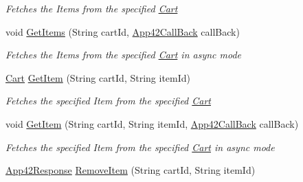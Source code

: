 \begin{DoxyCompactItemize}
\begin{DoxyCompactList}\small\item\em Fetches the Items from the specified \hyperlink{classcom_1_1shephertz_1_1app42_1_1paas_1_1sdk_1_1csharp_1_1shopping_1_1_cart}{Cart} \end{DoxyCompactList}\item 
void \hyperlink{classcom_1_1shephertz_1_1app42_1_1paas_1_1sdk_1_1csharp_1_1shopping_1_1_cart_service_a9acdad2e9b0f1a8f81d6e87d1d04dfe1}{Get\+Items} (String cart\+Id, \hyperlink{interfacecom_1_1shephertz_1_1app42_1_1paas_1_1sdk_1_1csharp_1_1_app42_call_back}{App42\+Call\+Back} call\+Back)
\begin{DoxyCompactList}\small\item\em Fetches the Items from the specified \hyperlink{classcom_1_1shephertz_1_1app42_1_1paas_1_1sdk_1_1csharp_1_1shopping_1_1_cart}{Cart} in async mode \end{DoxyCompactList}\item 
\hyperlink{classcom_1_1shephertz_1_1app42_1_1paas_1_1sdk_1_1csharp_1_1shopping_1_1_cart}{Cart} \hyperlink{classcom_1_1shephertz_1_1app42_1_1paas_1_1sdk_1_1csharp_1_1shopping_1_1_cart_service_a76c71f83b16bacb5ea60d1f59ee132e8}{Get\+Item} (String cart\+Id, String item\+Id)
\begin{DoxyCompactList}\small\item\em Fetches the specified Item from the specified \hyperlink{classcom_1_1shephertz_1_1app42_1_1paas_1_1sdk_1_1csharp_1_1shopping_1_1_cart}{Cart} \end{DoxyCompactList}\item 
void \hyperlink{classcom_1_1shephertz_1_1app42_1_1paas_1_1sdk_1_1csharp_1_1shopping_1_1_cart_service_ae8f26f26aa358fb58fce07d5495c3fd0}{Get\+Item} (String cart\+Id, String item\+Id, \hyperlink{interfacecom_1_1shephertz_1_1app42_1_1paas_1_1sdk_1_1csharp_1_1_app42_call_back}{App42\+Call\+Back} call\+Back)
\begin{DoxyCompactList}\small\item\em Fetches the specified Item from the specified \hyperlink{classcom_1_1shephertz_1_1app42_1_1paas_1_1sdk_1_1csharp_1_1shopping_1_1_cart}{Cart} in async mode \end{DoxyCompactList}\item 
\hyperlink{classcom_1_1shephertz_1_1app42_1_1paas_1_1sdk_1_1csharp_1_1_app42_response}{App42\+Response} \hyperlink{classcom_1_1shephertz_1_1app42_1_1paas_1_1sdk_1_1csharp_1_1shopping_1_1_cart_service_ac4e4b73d62f0d6a64a5f7aaeb75e3570}{Remove\+Item} (String cart\+Id, String item\+Id)

\end{DoxyCompactItemize}
